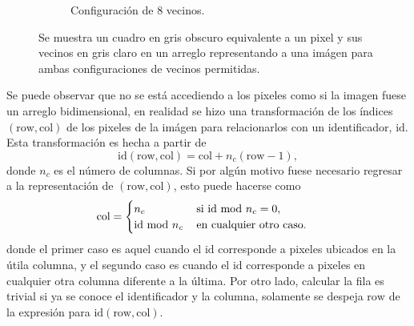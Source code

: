 \begin{enumerate}
\begin{solution}
\begin{figure}[ht!]
\begin{subfigure}{0.4\textwidth}
                \caption{Configuración de 8 vecinos.}
            \end{subfigure}
            \caption{Se muestra un cuadro en gris obscuro equivalente a un pixel y sus vecinos en gris claro en un arreglo representando a una imágen para ambas configuraciones de vecinos permitidas.}
            \label{fig:ideal_pixel}
        \end{figure}

        Se puede observar que no se está accediendo a los pixeles como si la imagen fuese un arreglo bidimensional, en realidad se hizo una transformación de los índices $(\text{row}, \text{col})$ de los pixeles de la imágen para relacionarlos con un identificador, $\text{id}$. Esta transformación es hecha a partir de 
        \begin{equation*}
            \text{id}(\text{row}, \text{col}) = \text{col} + n_c (\text{row} - 1),
        \end{equation*}
        donde $n_c$ es el número de columnas. Si por algún motivo fuese necesario regresar a la representación de $(\text{row}, \text{col})$, esto puede hacerse como
        \begin{equation*}
            \text{col} = 
            \begin{cases}
                n_c\ \hspace{1.5cm}\text{si id mod } n_c = 0 , \\
                \text{id mod } n_c \hspace{0.3cm}\text{ en cualquier otro caso.}
            \end{cases}
        \end{equation*}
        donde el primer caso es aquel cuando el $\text{id}$ corresponde a pixeles ubicados en la útila columna, y el segundo caso es cuando el $\text{id}$ corresponde a pixeles en cualquier otra columna diferente a la última. Por otro lado, calcular la fila es trivial si ya se conoce el identificador y la columna, solamente se despeja $\text{row}$ de la expresión para $\text{id}(\text{row}, \text{col})$.


\end{solution}
\end{enumerate}

